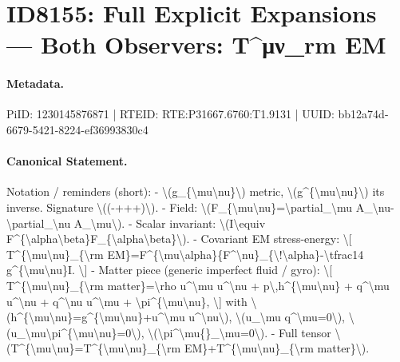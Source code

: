 \section*{ID8155: Full Explicit Expansions — Both Observers: T\textasciicircum{}μν\_rm EM}
\paragraph{Metadata.}
PiID: 1230145876871 | RTEID: RTE:P31667.6760:T1.9131 | UUID: bb12a74d-6679-5421-8224-ef36993830c4

\paragraph{Canonical Statement.}
Notation / reminders (short): - \textbackslash{}(g\_\{\textbackslash{}mu\textbackslash{}nu\}\textbackslash{}) metric, \textbackslash{}(g\textasciicircum{}\{\textbackslash{}mu\textbackslash{}nu\}\textbackslash{}) its inverse. Signature \textbackslash{}((-+++)\textbackslash{}). - Field: \textbackslash{}(F\_\{\textbackslash{}mu\textbackslash{}nu\}=\textbackslash{}partial\_\textbackslash{}mu A\_\textbackslash{}nu-\textbackslash{}partial\_\textbackslash{}nu A\_\textbackslash{}mu\textbackslash{}). - Scalar invariant: \textbackslash{}(I\textbackslash{}equiv F\textasciicircum{}\{\textbackslash{}alpha\textbackslash{}beta\}F\_\{\textbackslash{}alpha\textbackslash{}beta\}\textbackslash{}). - Covariant EM stress-energy: \textbackslash{}[ T\textasciicircum{}\{\textbackslash{}mu\textbackslash{}nu\}\_\{\textbackslash{}rm EM\}=F\textasciicircum{}\{\textbackslash{}mu\textbackslash{}alpha\}\{F\textasciicircum{}\textbackslash{}nu\}\_\{\textbackslash{}!\textbackslash{}alpha\}-\textbackslash{}tfrac14 g\textasciicircum{}\{\textbackslash{}mu\textbackslash{}nu\}I. \textbackslash{}] - Matter piece (generic imperfect fluid / gyro): \textbackslash{}[ T\textasciicircum{}\{\textbackslash{}mu\textbackslash{}nu\}\_\{\textbackslash{}rm matter\}=\textbackslash{}rho u\textasciicircum{}\textbackslash{}mu u\textasciicircum{}\textbackslash{}nu + p\textbackslash{},h\textasciicircum{}\{\textbackslash{}mu\textbackslash{}nu\} + q\textasciicircum{}\textbackslash{}mu u\textasciicircum{}\textbackslash{}nu + q\textasciicircum{}\textbackslash{}nu u\textasciicircum{}\textbackslash{}mu + \textbackslash{}pi\textasciicircum{}\{\textbackslash{}mu\textbackslash{}nu\}, \textbackslash{}] with \textbackslash{}(h\textasciicircum{}\{\textbackslash{}mu\textbackslash{}nu\}=g\textasciicircum{}\{\textbackslash{}mu\textbackslash{}nu\}+u\textasciicircum{}\textbackslash{}mu u\textasciicircum{}\textbackslash{}nu\textbackslash{}), \textbackslash{}(u\_\textbackslash{}mu q\textasciicircum{}\textbackslash{}mu=0\textbackslash{}), \textbackslash{}(u\_\textbackslash{}mu\textbackslash{}pi\textasciicircum{}\{\textbackslash{}mu\textbackslash{}nu\}=0\textbackslash{}), \textbackslash{}(\textbackslash{}pi\textasciicircum{}\textbackslash{}mu\{\}\_\textbackslash{}mu=0\textbackslash{}). - Full tensor \textbackslash{}(T\textasciicircum{}\{\textbackslash{}mu\textbackslash{}nu\}=T\textasciicircum{}\{\textbackslash{}mu\textbackslash{}nu\}\_\{\textbackslash{}rm EM\}+T\textasciicircum{}\{\textbackslash{}mu\textbackslash{}nu\}\_\{\textbackslash{}rm matter\}\textbackslash{}).

